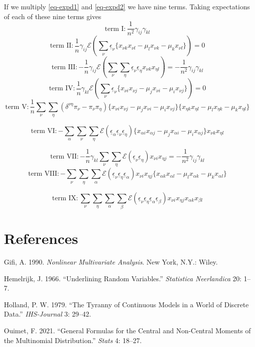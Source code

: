 \documentclass[
  12pt,
  letterpaper,
  DIV=11,
  numbers=noendperiod]{scrartcl}
\newlength{\cslhangindent}
\newenvironment{CSLReferences}[2] %
 {\begin{list}{}{%
  \setlength{\itemindent}{0pt}
  \setlength{\leftmargin}{0pt}
  \setlength{\parsep}{0pt}
  \ifodd #1
   \setlength{\leftmargin}{\cslhangindent}
   \setlength{\itemindent}{-1\cslhangindent}
  \fi
  \setlength{\itemsep}{#2\baselineskip}}}
 {\end{list}}
\newcommand{\sectionbreak}{\clearpage}
\newcommand{\ul}[1]{\underline{#1}}
\begin{document}
If we multiply \eqref{eq-expd1} and \eqref{eq-expd2} we have nine terms.
Taking expectations of each of these nine terms gives \[
\text{term I}:\frac{1}{n^2}\gamma_{ij}\gamma_{kl}
\] \[
\text{term II}:\frac{1}{n}\gamma_{ij}\mathcal{E}(\sum_\nu\ul{\epsilon}_\nu\{x_{\nu k}x_{\nu l}
-\mu_lx_{\nu k}-\mu_kx_{\nu l}\})=0
\] \[
\text{term III}:-\frac{1}{n}\gamma_{ij}\mathcal{E}(\sum_\nu\sum_\eta\ul{\epsilon}_\nu\ul{\epsilon}_\eta x_{\nu k}x_{\eta l})=-\frac{1}{n^2}\gamma_{ij}\gamma_{kl}
\] \[
\text{term IV}:\frac{1}{n}\gamma_{kl}\mathcal{E}(\sum_\nu\ul{\epsilon}_\nu\{x_{\nu i}x_{\nu j}
-\mu_jx_{\nu i}-\mu_ix_{\nu j}\})=0
\] \[
\text{term V}:\frac{1}{n}\sum_\nu\sum_\eta(\delta^{\nu\eta}\pi_\nu-\pi_\nu\pi_\eta)\{x_{\nu i}x_{\nu j}
-\mu_jx_{\nu i}-\mu_ix_{\nu j}\}\{x_{\eta k}x_{\eta l}
-\mu_lx_{\eta k}-\mu_kx_{\eta l}\}
\]

\[
\text{term VI}:-\sum_\alpha\sum_\nu\sum_\eta\mathcal{E}(\ul{\epsilon}_\alpha\ul{\epsilon}_\nu\ul{\epsilon}_\eta)\{x_{\alpha i}x_{\alpha j}
-\mu_jx_{\alpha i}-\mu_ix_{\alpha j}\} x_{\nu k}x_{\eta l}
\]

\[
\text{term VII}:-\frac{1}{n}\gamma_{kl}\sum_\nu\sum_\eta\mathcal{E}(\ul{\epsilon}_\nu\ul{\epsilon}_\eta) x_{\nu i}x_{\eta j}=-\frac{1}{n^2}\gamma_{ij}\gamma_{kl}
\] \[
\text{term VIII}:-\sum_\nu\sum_\eta\sum_\alpha\mathcal{E}(\ul{\epsilon}_\nu\ul{\epsilon}_\eta\ul{\epsilon}_\alpha)x_{\nu i}x_{\eta j}\{x_{\alpha k}x_{\alpha l}
-\mu_lx_{\alpha k}-\mu_kx_{\alpha l}\}
\]

\[
\text{term IX}:\sum_\nu\sum_\eta\sum_\alpha\sum_\beta\mathcal{E}(\ul{\epsilon}_\nu\ul{\epsilon}_\eta\ul{\epsilon}_\alpha\ul{\epsilon}_\beta) x_{\nu i}x_{\eta j}x_{\alpha k}x_{\beta l}
\]

\sectionbreak

\section*{References}\label{references}

\label{refs}
\begin{CSLReferences}{1}{0}
Gifi, A. 1990. \emph{Nonlinear Multivariate Analysis}. New York, N.Y.:
Wiley.

Hemelrijk, J. 1966. {``{Underlining Random Variables}.''}
\emph{Statistica Neerlandica} 20: 1--7.

Holland, P. W. 1979. {``{The Tyranny of Continuous Models in a World of
Discrete Data}.''} \emph{IHS-Journal} 3: 29--42.

Ouimet, F. 2021. {``General Formulas for the Central and Non-Central
Moments of the Multinomial Distribution.''} \emph{Stats} 4: 18--27.

\end{CSLReferences}
\end{document}
